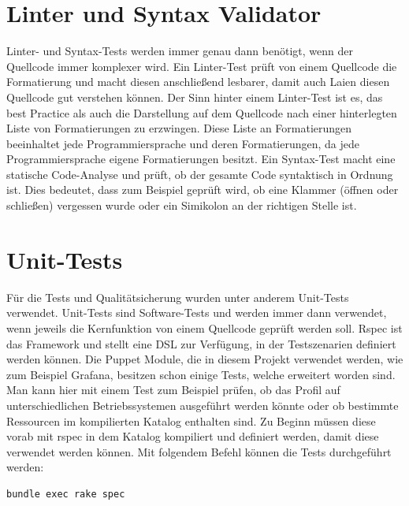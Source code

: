 \section{Linter und Syntax Validator}
Linter- und Syntax-Tests werden immer genau dann benötigt, wenn der Quellcode
immer komplexer wird. Ein Linter-Test prüft von einem Quellcode die
Formatierung und macht diesen anschließend lesbarer, damit auch Laien diesen
Quellcode gut verstehen können. Der Sinn hinter einem Linter-Test ist es, das
best Practice als auch die Darstellung auf dem Quellcode nach einer
hinterlegten Liste von Formatierungen zu erzwingen. Diese Liste an
Formatierungen beeinhaltet jede Programmiersprache und deren Formatierungen,
da jede Programmiersprache eigene Formatierungen besitzt. Ein Syntax-Test macht
eine statische Code-Analyse und prüft, ob der gesamte Code syntaktisch in
Ordnung ist. Dies bedeutet, dass zum Beispiel geprüft wird, ob eine Klammer
(öffnen oder schließen) vergessen wurde oder ein Simikolon an der richtigen
Stelle ist.
\mr%

\section{Unit-Tests}
\label{sec:unit_tests}
Für die Tests und Qualitätsicherung wurden unter anderem Unit-Tests verwendet.
Unit-Tests sind Software-Tests und werden immer dann verwendet, wenn jeweils
die Kernfunktion von einem Quellcode geprüft werden soll. Rspec ist das
Framework und stellt eine \gls{DSL} zur Verfügung, in der Testszenarien
definiert werden können. Die Puppet Module, die in diesem Projekt verwendet
werden, wie zum Beispiel Grafana, besitzen schon einige Tests, welche erweitert
worden sind. Man kann hier mit einem Test zum Beispiel prüfen, ob das Profil
auf unterschiedlichen Betriebssystemen ausgeführt werden könnte oder ob
bestimmte Ressourcen im kompilierten Katalog enthalten sind. Zu Beginn müssen
diese vorab mit rspec in dem Katalog kompiliert und definiert werden, damit
diese verwendet werden können. Mit folgendem Befehl können die Tests
durchgeführt werden:
\begin{verbatim}
bundle exec rake spec
\end{verbatim}

